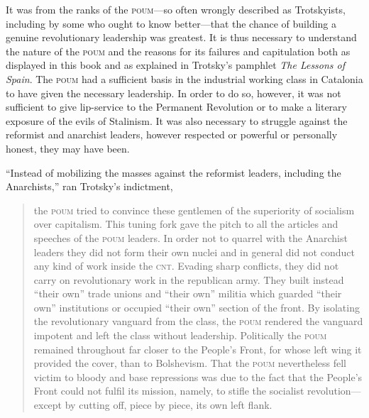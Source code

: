 It was from the ranks of the \textsc{poum}---so often wrongly described as Trotskyists, including by some who ought to know better---that the chance of building a genuine revolutionary leadership was greatest. It is thus necessary to understand the nature of the \textsc{poum} and the reasons for its failures and capitulation both as displayed in this book and as explained in Trotsky’s pamphlet \emph{The Lessons of Spain}. The \textsc{poum} had a sufficient basis in the industrial working class in Catalonia to have given the necessary leadership. In order to do so, however, it was not sufficient to give lip-service to the Permanent Revolution or to make a literary exposure of the evils of Stalinism. It was also necessary to struggle against the reformist and anarchist leaders, however respected or powerful or personally honest, they may have been.

``Instead of mobilizing the masses against the reformist leaders, including the Anarchists,'' ran Trotsky’s indictment,

\begin{quote}
  the \textsc{poum} tried to convince these gentlemen of the superiority of socialism over capitalism. This tuning fork gave the pitch to all the articles and speeches of the \textsc{poum} leaders. In order not to quarrel with the Anarchist leaders they did not form their own nuclei and in general did not conduct any kind of work inside the \textsc{cnt}. Evading sharp conflicts, they did not carry on revolutionary work in the republican army. They built instead ``their own'' trade unions and ``their own'' militia which guarded ``their own'' institutions or occupied ``their own'' section of the front. By isolating the revolutionary vanguard from the class, the \textsc{poum} rendered the vanguard impotent and left the class without leadership. Politically the \textsc{poum} remained throughout far closer to the People’s Front, for whose left wing it provided the cover, than to Bolshevism. That the \textsc{poum} nevertheless fell victim to bloody and base repressions was due to the fact that the People’s Front could not fulfil its mission, namely, to stifle the socialist revolution---except by cutting off, piece by piece, its own left flank.
\end{quote}

